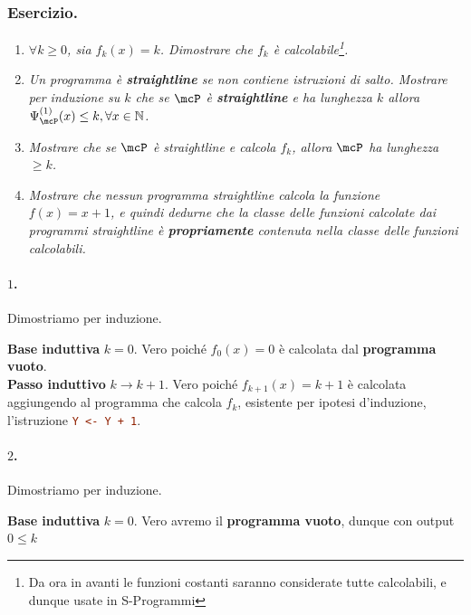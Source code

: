 \newpage
\subsubsection*{Esercizio.}

\begin{enumerate}
    \item \textit{\(\forall k\geq0\), sia \(f_k(x)=k\). Dimostrare che \(f_k\) è calcolabile\footnote{Da ora in avanti le funzioni costanti saranno considerate tutte calcolabili, e dunque usate in S-Programmi}.}

    \item \textit{Un programma è \textbf{straightline} se non contiene istruzioni di salto. Mostrare per induzione su \(k\) che se \(\mcP\) è \textbf{straightline} e ha lunghezza \(k\) allora \(\Psi_{\mcP}^{(1)}(x)\leq k, \forall x \in \mathbb{N}\).}

    \item \textit{Mostrare che se \(\mcP\) è straightline e calcola \(f_k\), allora \(\mcP\) ha lunghezza \(\geq k\).}

    \item \textit{Mostrare che nessun programma straightline calcola la funzione \(f(x)=x+1\), e quindi dedurne che la classe delle funzioni calcolate dai programmi straightline è \textbf{propriamente} contenuta nella classe delle funzioni calcolabili.}
\end{enumerate}

\paragraph*{\(1\).} Dimostriamo per induzione.\label{Esercizio f_k(x)=k}

\textbf{Base induttiva} \(k=0\). Vero poiché \(f_0(x)=0\) è calcolata dal \textbf{programma vuoto}. \\
\textbf{Passo induttivo} \(k\to k+1\). Vero poiché \(f_{k+1}(x)=k+1\) è calcolata aggiungendo al programma che calcola \(f_k\), esistente per ipotesi d'induzione, l'istruzione \lstinline[language=ini]{Y <- Y + 1}.

\paragraph*{\(2\).} Dimostriamo per induzione.\label{Esercizio Straightline P lunghezza <= k}

\textbf{Base induttiva} \(k=0\). Vero avremo il \textbf{programma vuoto}, dunque con output \(0\leq k\)

